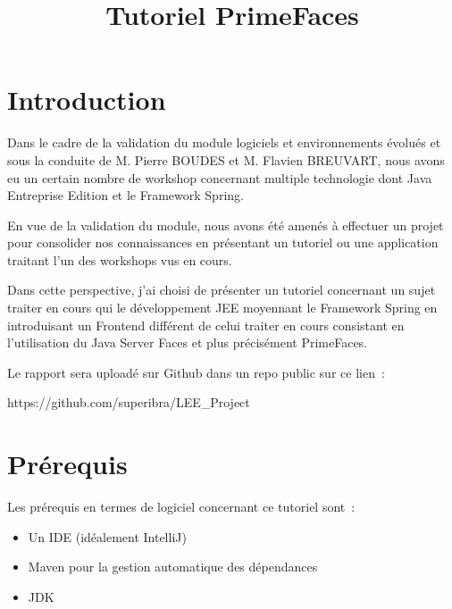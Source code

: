 \documentclass[12pt]{article}
\title{Tutoriel PrimeFaces}
\date{}
\begin{document}
\maketitle
\par


\vspace{\baselineskip}
\section*{Introduction}
Dans le cadre de la validation du module logiciels et environnements évolués et sous la conduite de M. Pierre BOUDES et M. Flavien BREUVART, nous avons eu un certain nombre de workshop concernant multiple technologie dont Java Entreprise Edition et le Framework Spring.\par

En vue de la validation du module, nous avons été amenés à effectuer un projet pour consolider nos connaissances en présentant un tutoriel ou une application traitant l’un des workshops vus en cours.\par

Dans cette perspective, j’ai choisi de présenter un tutoriel concernant un sujet traiter en cours qui le développement JEE moyennant le Framework Spring en introduisant un Frontend différent de celui traiter en cours consistant en l’utilisation du Java Server Faces et plus précisément PrimeFaces.\par

Le rapport sera uploadé sur Github dans un repo public sur ce lien : \par

\begin{Center}
https://github.com/superibra/LEE\_Project
\end{Center}\par

\section{Prérequis}
Les prérequis en termes de logiciel concernant ce tutoriel sont :\par

\begin{itemize}
	\item Un IDE (idéalement IntelliJ)\par

	\item Maven pour la gestion automatique des dépendances\par

	\item JDK
\end{itemize}\par
\end{document}
